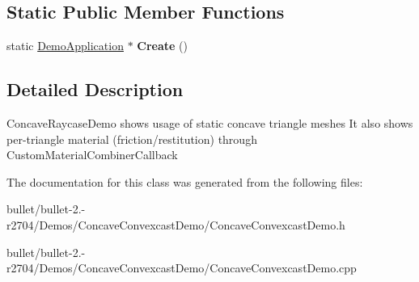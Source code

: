 \subsection*{Static Public Member Functions}
\begin{DoxyCompactItemize}
\item 
\hypertarget{class_concave_convexcast_demo_a1c8bfd444c2826d4a1d7d9cc6eb5abe2}{static \hyperlink{class_demo_application}{Demo\+Application} $\ast$ {\bfseries Create} ()}\label{class_concave_convexcast_demo_a1c8bfd444c2826d4a1d7d9cc6eb5abe2}

\end{DoxyCompactItemize}


\subsection{Detailed Description}
Concave\+Raycase\+Demo shows usage of static concave triangle meshes It also shows per-\/triangle material (friction/restitution) through Custom\+Material\+Combiner\+Callback 

The documentation for this class was generated from the following files\+:\begin{DoxyCompactItemize}
\item 
bullet/bullet-\/2.-\/r2704/\+Demos/\+Concave\+Convexcast\+Demo/Concave\+Convexcast\+Demo.\+h\item 
bullet/bullet-\/2.-\/r2704/\+Demos/\+Concave\+Convexcast\+Demo/Concave\+Convexcast\+Demo.\+cpp\end{DoxyCompactItemize}
